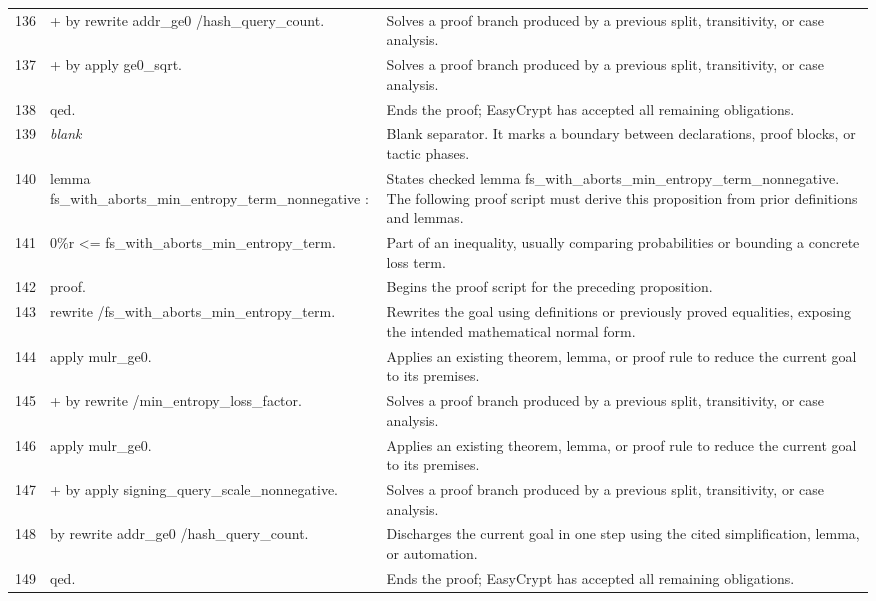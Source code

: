 \documentclass[10pt]{article}
\begin{document}
\begin{longtable}{r L{0.53\textwidth} L{0.37\textwidth}}
136 & {\ttfamily\scriptsize + by rewrite addr\_ge0 /hash\_query\_count.} & Solves a proof branch produced by a previous split, transitivity, or case analysis. \\
137 & {\ttfamily\scriptsize + by apply ge0\_sqrt.} & Solves a proof branch produced by a previous split, transitivity, or case analysis. \\
138 & {\ttfamily\scriptsize qed.} & Ends the proof; EasyCrypt has accepted all remaining obligations. \\
139 & {\ttfamily\scriptsize \emph{blank}} & Blank separator.  It marks a boundary between declarations, proof blocks, or tactic phases. \\
140 & {\ttfamily\scriptsize lemma fs\_with\_aborts\_min\_entropy\_term\_nonnegative :} & States checked lemma fs\_with\_aborts\_min\_entropy\_term\_nonnegative.  The following proof script must derive this proposition from prior definitions and lemmas. \\
141 & {\ttfamily\scriptsize   0\%r <= fs\_with\_aborts\_min\_entropy\_term.} & Part of an inequality, usually comparing probabilities or bounding a concrete loss term. \\
142 & {\ttfamily\scriptsize proof.} & Begins the proof script for the preceding proposition. \\
143 & {\ttfamily\scriptsize rewrite /fs\_with\_aborts\_min\_entropy\_term.} & Rewrites the goal using definitions or previously proved equalities, exposing the intended mathematical normal form. \\
144 & {\ttfamily\scriptsize apply mulr\_ge0.} & Applies an existing theorem, lemma, or proof rule to reduce the current goal to its premises. \\
145 & {\ttfamily\scriptsize + by rewrite /min\_entropy\_loss\_factor.} & Solves a proof branch produced by a previous split, transitivity, or case analysis. \\
146 & {\ttfamily\scriptsize apply mulr\_ge0.} & Applies an existing theorem, lemma, or proof rule to reduce the current goal to its premises. \\
147 & {\ttfamily\scriptsize + by apply signing\_query\_scale\_nonnegative.} & Solves a proof branch produced by a previous split, transitivity, or case analysis. \\
148 & {\ttfamily\scriptsize by rewrite addr\_ge0 /hash\_query\_count.} & Discharges the current goal in one step using the cited simplification, lemma, or automation. \\
149 & {\ttfamily\scriptsize qed.} & Ends the proof; EasyCrypt has accepted all remaining obligations. \\

\end{longtable}
\end{document}

